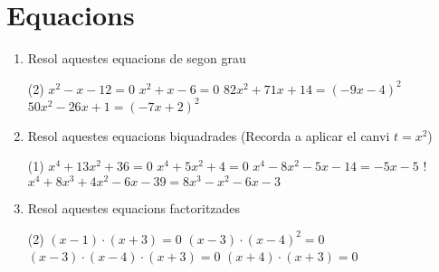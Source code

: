 \documentclass[a4paper]{article}
\begin{document}
    \section{Equacions}
       \begin{enumerate}[resume]
      \item Resol aquestes equacions de segon grau
      \begin{tasks}(2)
        \task $ x^{2} - x -12 =0$
        \task $ x^{2} +  x -6 =0$
        \task $82 x^{2} + 71 x + 14 =\left(-9 x -4\right)^2$
        \task $50 x^{2} -26 x + 1 =\left(-7 x + 2\right)^2$
      \end{tasks}
      \item Resol aquestes equacions biquadrades (Recorda a aplicar el canvi $t=x^2$)
      \begin{tasks}(1)
        \task $ x^{4}  + 13 x^{2}  + 36 =0$
        \task $ x^{4}  + 5 x^{2}  + 4 =0$
        \task $ x^{4}  -8 x^{2} -5 x -14 =-5 x -5$
        \task! $ x^{4} + 8 x^{3} + 4 x^{2} -6 x -39 =8 x^{3} - x^{2} -6 x -3$
      \end{tasks}
      \item Resol aquestes equacions factoritzades
      \begin{tasks}(2)
        \task $\left( x -1\right) \cdot \left( x  + 3\right) =0$
        \task $\left( x -3\right) \cdot \left( x -4\right)^{2} =0$
        \task $\left( x -3\right) \cdot \left( x -4\right) \cdot \left( x  + 3\right) =0$
        \task $\left( x  + 4\right) \cdot \left( x  + 3\right) =0$
      \end{tasks}
  \par \noindent \vspace{0.25cm} 
  \vspace{0.25cm}
  

\end{enumerate}
\end{document}
